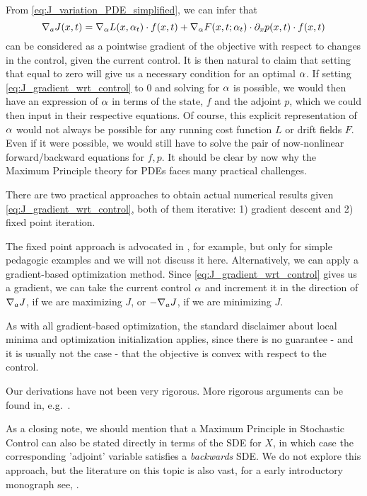 From \cref{eq:J_variation_PDE_simplified}, we can infer that 
\begin{equation}
{ \nabla }_a J(x,t) = { \nabla }_\alpha L(x, \alpha_t) \cdot f(x,t) +
 { \nabla }_\alpha F(x,t;\alpha_t) \cdot {\partial}_xp(x,t) \cdot f(x,t)  
\label{eq:J_gradient_wrt_control}
\end{equation}
can be considered as a pointwise gradient of the objective with respect to
changes in the control, given the current control. It is then natural to claim
that setting that equal to zero will give us a necessary condition for an optimal
$\alpha$.  If setting \cref{eq:J_gradient_wrt_control} to 0 and solving for $\alpha$
is possible,  we would then  have an
expression of $\alpha$ in terms of the state, $f$ and the adjoint $p$, which we
could then input in their respective equations. Of course, this explicit
representation of $\alpha$ would not always be possible for any running cost function $L$ or drift fields $F$. Even if it were possible, we
would still have to solve the pair of now-nonlinear forward/backward equations
for $f,p$. It should be clear by now why the Maximum Principle theory for PDEs
faces many practical challenges. 

There are two practical approaches to obtain actual numerical results given
\cref{eq:J_gradient_wrt_control}, both of them iterative: 1) gradient
descent and 2) fixed point iteration. 

The fixed point approach is advocated in \cite{Lenhart2007}, for example, but
only for simple pedagogic examples and we will not discuss it here.
Alternatively, we can apply a gradient-based optimization method. Since
\cref{eq:J_gradient_wrt_control} gives us a gradient, we can take the current
control $\alpha$ and increment it in the direction of ${ \nabla }_a J$, if we are
maximizing $J$,  or  $-{ \nabla }_a J$, if we are minimizing $J$.

As with all gradient-based optimization, the standard disclaimer about local
minima and optimization initialization applies, since there is no guarantee -  and
 it is usually not the case - that the objective is convex with respect to the
control. 

Our derivations have not been very rigorous. More rigorous arguments can be
found in, e.g.\ \cite{Fattorini1999,Borzi2012}. 
  
As a closing note, we should mention that a Maximum Principle in Stochastic
Control can also be stated directly in terms of the SDE for $X$, in which
case the corresponding 'adjoint' variable satisfies a {\sl backwards} SDE. We
do not explore this approach, but the literature on this topic is also vast, for a
early introductory monograph see, \cite{Haussmann1986}.  
 
